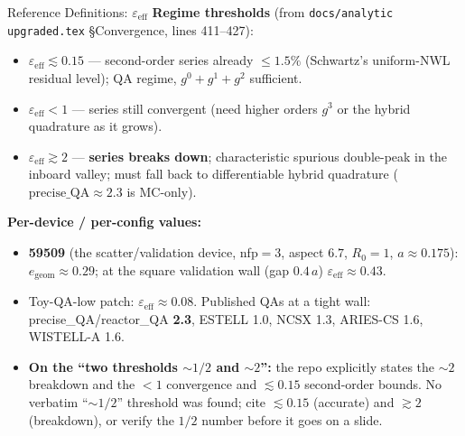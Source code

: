 \documentclass[11pt,aspectratio=169]{beamer}
\begin{document}
\begin{frame}[allowframebreaks]{Reference Definitions: $\varepsilon_{\mathrm{eff}}$}
\framebreak
\textbf{Regime thresholds} (from \texttt{docs/analytic upgraded.tex} \S Convergence, lines 411--427):
\begin{itemize}
\item $\varepsilon_{\mathrm{eff}} \lesssim 0.15$ --- second-order series already $\le 1.5\%$
      (Schwartz's uniform-NWL residual level); QA regime, $g^0 + g^1 + g^2$ sufficient.
\item $\varepsilon_{\mathrm{eff}} < 1$ --- series still convergent (need higher orders $g^3$
      or the hybrid quadrature as it grows).
\item $\varepsilon_{\mathrm{eff}} \gtrsim 2$ --- \textbf{series breaks down}; characteristic
      spurious double-peak in the inboard valley; must fall back to differentiable hybrid
      quadrature ($\mathrm{precise\_QA} \approx 2.3$ is MC-only).
\end{itemize}
\textbf{Per-device / per-config values:}
\begin{itemize}
\item \textbf{59509} (the scatter/validation device, nfp$=3$, aspect $6.7$, $R_0=1$,
      $a \approx 0.175$): $e_{\text{geom}} \approx 0.29$; at the square validation wall
      (gap $0.4\,a$) \textbf{$\varepsilon_{\mathrm{eff}} \approx 0.43$}.
\item Toy-QA-low patch: $\varepsilon_{\mathrm{eff}} \approx 0.08$. Published QAs at a tight
      wall: precise\_QA/reactor\_QA \textbf{2.3}, ESTELL 1.0, NCSX 1.3, ARIES-CS 1.6,
      WISTELL-A 1.6.
\item \textbf{On the ``two thresholds $\sim 1/2$ and $\sim 2$'':} the repo explicitly states
      the $\sim 2$ breakdown and the $<1$ convergence and $\lesssim 0.15$ second-order
      bounds. No verbatim ``$\sim 1/2$'' threshold was found; cite $\lesssim 0.15$ (accurate)
      and $\gtrsim 2$ (breakdown), or verify the $1/2$ number before it goes on a slide.
\end{itemize}
\end{frame}
\end{document}
